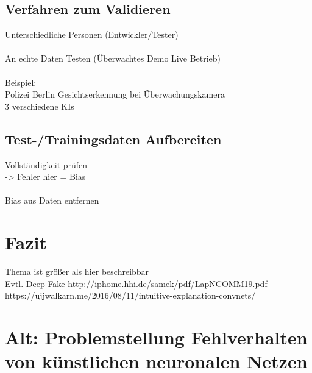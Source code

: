 \documentclass[12pt,oneside,a4paper,parskip]{scrbook}
\begin{document}
\section{Verfahren zum Validieren}
Unterschiedliche Personen (Entwickler/Tester)
\\\\An echte Daten Testen (Überwachtes Demo Live Betrieb)
\\\\Beispiel:
\\Polizei Berlin Gesichtserkennung bei Überwachungskamera 
\\3 verschiedene KIs
\section{Test-/Trainingsdaten Aufbereiten}
Vollständigkeit prüfen
\\-> Fehler hier = Bias
\\\\ Bias aus Daten entfernen

\chapter{Fazit}
Thema ist größer als hier beschreibbar
\\Evtl. Deep Fake
http://iphome.hhi.de/samek/pdf/LapNCOMM19.pdf
https://ujjwalkarn.me/2016/08/11/intuitive-explanation-convnets/


\chapter{Alt: Problemstellung Fehlverhalten von künstlichen neuronalen Netzen}
\end{document}
